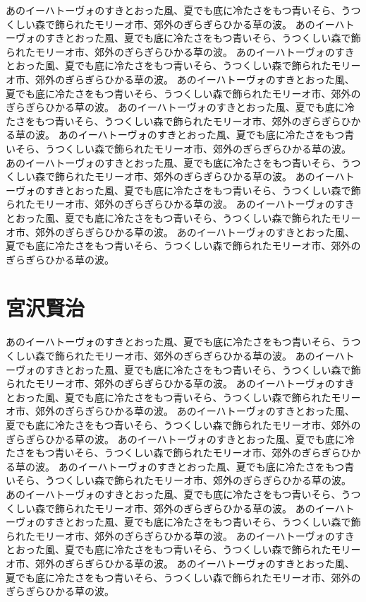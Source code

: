 \documentclass[b5j]{ltjsbook}
\begin{document}
あのイーハトーヴォのすきとおった風、夏でも底に冷たさをもつ青いそら、うつくしい森で飾られたモリーオ市、郊外のぎらぎらひかる草の波。
あのイーハトーヴォのすきとおった風、夏でも底に冷たさをもつ青いそら、うつくしい森で飾られたモリーオ市、郊外のぎらぎらひかる草の波。
あのイーハトーヴォのすきとおった風、夏でも底に冷たさをもつ青いそら、うつくしい森で飾られたモリーオ市、郊外のぎらぎらひかる草の波。
あのイーハトーヴォのすきとおった風、夏でも底に冷たさをもつ青いそら、うつくしい森で飾られたモリーオ市、郊外のぎらぎらひかる草の波。
あのイーハトーヴォのすきとおった風、夏でも底に冷たさをもつ青いそら、うつくしい森で飾られたモリーオ市、郊外のぎらぎらひかる草の波。
あのイーハトーヴォのすきとおった風、夏でも底に冷たさをもつ青いそら、うつくしい森で飾られたモリーオ市、郊外のぎらぎらひかる草の波。
あのイーハトーヴォのすきとおった風、夏でも底に冷たさをもつ青いそら、うつくしい森で飾られたモリーオ市、郊外のぎらぎらひかる草の波。
あのイーハトーヴォのすきとおった風、夏でも底に冷たさをもつ青いそら、うつくしい森で飾られたモリーオ市、郊外のぎらぎらひかる草の波。
あのイーハトーヴォのすきとおった風、夏でも底に冷たさをもつ青いそら、うつくしい森で飾られたモリーオ市、郊外のぎらぎらひかる草の波。
あのイーハトーヴォのすきとおった風、夏でも底に冷たさをもつ青いそら、うつくしい森で飾られたモリーオ市、郊外のぎらぎらひかる草の波。

\section{宮沢賢治}

あのイーハトーヴォのすきとおった風、夏でも底に冷たさをもつ青いそら、うつくしい森で飾られたモリーオ市、郊外のぎらぎらひかる草の波。
あのイーハトーヴォのすきとおった風、夏でも底に冷たさをもつ青いそら、うつくしい森で飾られたモリーオ市、郊外のぎらぎらひかる草の波。
あのイーハトーヴォのすきとおった風、夏でも底に冷たさをもつ青いそら、うつくしい森で飾られたモリーオ市、郊外のぎらぎらひかる草の波。
あのイーハトーヴォのすきとおった風、夏でも底に冷たさをもつ青いそら、うつくしい森で飾られたモリーオ市、郊外のぎらぎらひかる草の波。
あのイーハトーヴォのすきとおった風、夏でも底に冷たさをもつ青いそら、うつくしい森で飾られたモリーオ市、郊外のぎらぎらひかる草の波。
あのイーハトーヴォのすきとおった風、夏でも底に冷たさをもつ青いそら、うつくしい森で飾られたモリーオ市、郊外のぎらぎらひかる草の波。
あのイーハトーヴォのすきとおった風、夏でも底に冷たさをもつ青いそら、うつくしい森で飾られたモリーオ市、郊外のぎらぎらひかる草の波。
あのイーハトーヴォのすきとおった風、夏でも底に冷たさをもつ青いそら、うつくしい森で飾られたモリーオ市、郊外のぎらぎらひかる草の波。
あのイーハトーヴォのすきとおった風、夏でも底に冷たさをもつ青いそら、うつくしい森で飾られたモリーオ市、郊外のぎらぎらひかる草の波。
あのイーハトーヴォのすきとおった風、夏でも底に冷たさをもつ青いそら、うつくしい森で飾られたモリーオ市、郊外のぎらぎらひかる草の波。
\end{document}
